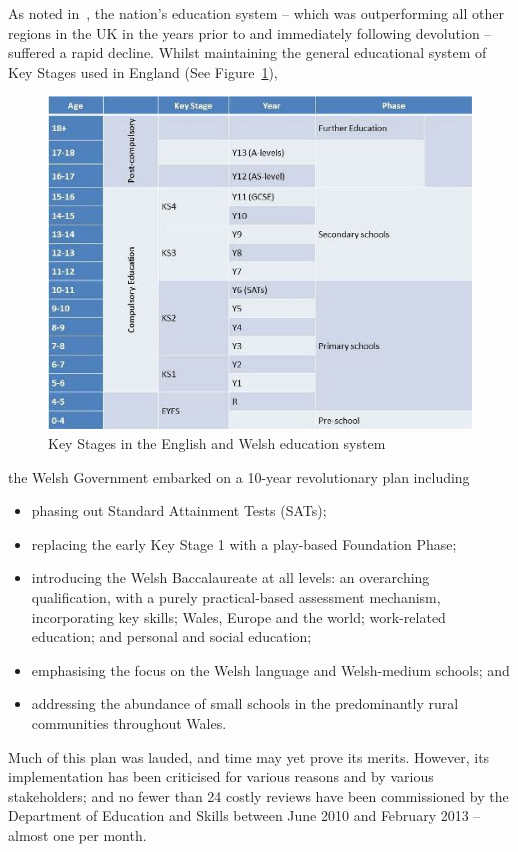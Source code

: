 \documentclass{sig-alternate}
\begin{document}
As noted in~\cite{Evans:2015},
the nation's education system
-- which was outperforming all other regions in the UK
in the years prior to and immediately following devolution --
suffered a rapid decline.
Whilst maintaining the general educational system of Key Stages
used in England (See Figure~\ref{fig:key-stages}),
\begin{figure}
  \centering
  \includegraphics[width=\columnwidth]{images/keystages.png}
  \caption{Key Stages in the English and Welsh education system}
  \label{fig:key-stages}
\end{figure}
the Welsh Government embarked on a 10-year revolutionary plan
including
\begin{itemize}
\item
phasing out Standard Attainment Tests (SATs);
\item
replacing the early Key Stage 1 with
a play-based Foundation Phase;
\item
introducing the Welsh Baccalaureate at all levels:
an overarching qualification,
with a purely practical-based assessment mechanism,
incorporating
key skills; Wales, Europe and the world;
work-related education; and personal and social education;
\item
emphasising the focus on the Welsh language and  Welsh-medium schools;
and
\item
addressing the abundance of small schools in the 
predominantly rural communities throughout Wales.
\end{itemize}
Much of this plan was lauded, and time may yet prove its merits.
However, its implementation has been criticised
for various reasons and by various stakeholders;
and no fewer than 24 costly reviews have been commissioned
by the Department of Education and Skills
between June 2010 and February 2013 -- almost one per month.
\end{document}
